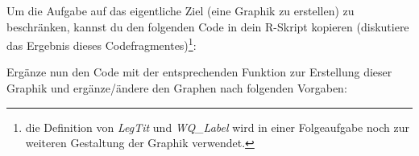 \documentclass[]{article}
\newenvironment{Shaded}{\begin{snugshade}}{\end{snugshade}}
\newcommand{\KeywordTok}[1]{\textcolor[rgb]{0.13,0.29,0.53}{\textbf{#1}}}
\newcommand{\DataTypeTok}[1]{\textcolor[rgb]{0.13,0.29,0.53}{#1}}
\newcommand{\DecValTok}[1]{\textcolor[rgb]{0.00,0.00,0.81}{#1}}
\newcommand{\StringTok}[1]{\textcolor[rgb]{0.31,0.60,0.02}{#1}}
\newcommand{\OperatorTok}[1]{\textcolor[rgb]{0.81,0.36,0.00}{\textbf{#1}}}
\newcommand{\NormalTok}[1]{#1}
\let\rmarkdownfootnote\footnote%
\def\footnote{\protect\rmarkdownfootnote}
\begin{document}
Um die Aufgabe auf das eigentliche Ziel (eine Graphik zu erstellen) zu
beschränken, kannst du den folgenden Code in dein R-Skript kopieren
(diskutiere das Ergebnis dieses Codefragmentes)\footnote{die Definition
  von \emph{LegTit} und \emph{WQ\_Label} wird in einer Folgeaufgabe noch
  zur weiteren Gestaltung der Graphik verwendet.}:

\begin{Shaded}
\end{Shaded}

Ergänze nun den Code mit der entsprechenden Funktion zur Erstellung
dieser Graphik und ergänze/ändere den Graphen nach folgenden Vorgaben:
\end{document}
